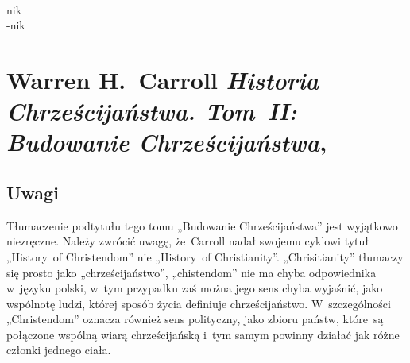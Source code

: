 \documentclass[a4paper,11pt]{article}
\begin{document}
\begin{center}
\begin{tabular}{|c|c|c|c|c|}
    \hline
  \end{tabular}

\end{center}

\VerSpaceSix


\noindent
{} \\
\Jest \hspace{5pt} nik \\
\Powin -nik \\











\section{Warren H.~Carroll \textit{Historia Chrześcijaństwa.
    Tom~II: Budowanie Chrześcijaństwa},
  \cite{CarrollHistoriaChrzecijanstwaVolII2010}}



\subsection{Uwagi}



\noindent
Tłumaczenie podtytułu tego tomu „Budowanie Chrześcijaństwa” jest wyjątkowo
niezręczne. Należy zwrócić uwagę, że~Carroll nadał swojemu cyklowi tytuł
„History~of Christendom” nie „History~of Christianity”. „Chrisitianity”
tłumaczy się prosto jako „chrześcijaństwo”, „chistendom” nie ma chyba
odpowiednika w~języku polski, w~tym przypadku zaś można jego sens chyba
wyjaśnić, jako wspólnotę ludzi, której sposób życia definiuje
chrześcijaństwo. W~szczególności „Christendom” oznacza również sens
polityczny, jako zbioru państw, które~są połączone wspólną wiarą
chrześcijańską i~tym samym powinny działać jak różne członki jednego ciała.
\end{document}

